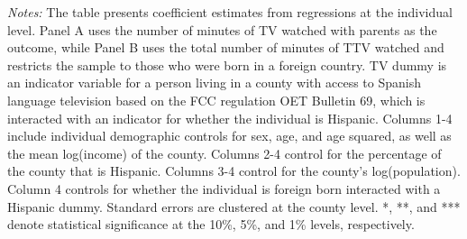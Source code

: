 \begin{table}[!htbp]
{\begin{threeparttable}
\begin{tablenotes}[flushleft]
				\item \textit{Notes:} The table presents coefficient estimates from regressions at the individual level. Panel A uses the number of minutes of TV watched with parents as the outcome, while Panel B uses the total number of minutes of TTV watched and restricts the sample to those who were born in a foreign country. TV dummy is an indicator variable for a person living in a county with access to Spanish language television based on the FCC regulation OET Bulletin 69, which is interacted with an indicator for whether the individual is Hispanic. Columns 1-4 include individual demographic controls for sex, age, and age squared, as well as the mean log(income) of the county. Columns 2-4 control for the percentage of the county that is Hispanic. Columns 3-4 control for the county's log(population). Column 4 controls for whether the individual is foreign born interacted with a Hispanic dummy. Standard errors are clustered at the county level. *, **, and *** denote statistical significance at the 10\%, 5\%, and 1\% levels, respectively.
			\end{tablenotes}
		\end{threeparttable}
	}
\end{table}